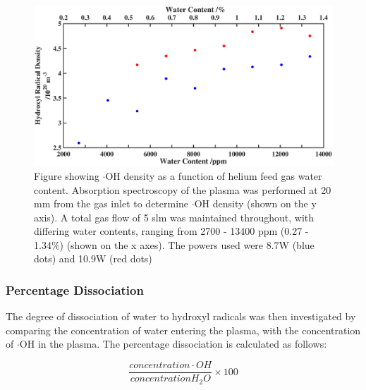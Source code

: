 \documentclass[11pt, oneside]{article}   	%
\begin{document}
\begin{figure}
    \centering
    \includegraphics[width=\textwidth]{Figures/WaterVariationBig}
    \caption{Figure showing $\cdot$OH density as a function of helium feed gas water content. Absorption spectroscopy of the plasma was performed at 20 mm from the gas inlet to determine $\cdot$OH density (shown on the y axis). A total gas flow of 5 slm was maintained throughout, with differing water contents, ranging from 2700 - 13400 ppm (0.27 - 1.34\%) (shown on the x axes). The powers used were 8.7W (blue dots) and 10.9W (red dots)}
    \label{fig:BubblerVariation}
\end{figure}


\subsubsection{Percentage Dissociation}

The degree of dissociation of water to hydroxyl radicals was then investigated by comparing the concentration of water entering the plasma, with the concentration of $\cdot$OH in the plasma.
The percentage dissociation is calculated as follows:

\begin{equation} \label{eqn:PercentDiss}
	\frac{concentration \cdot OH}{concentration  H_2O} \times 100
\end{equation}
\end{document}
